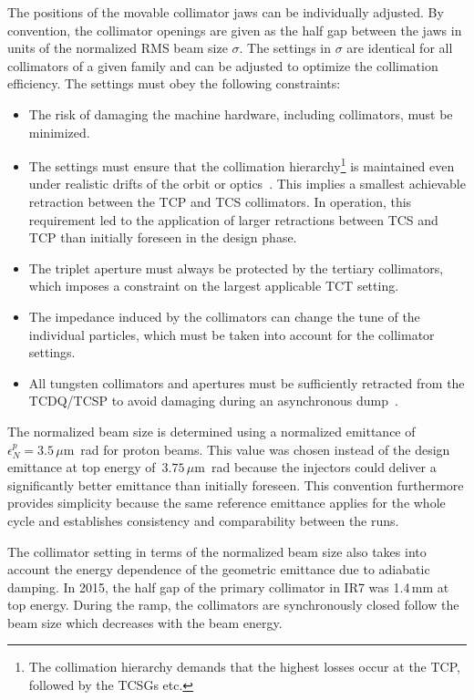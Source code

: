 The positions of the movable collimator jaws can be individually adjusted. By convention, the collimator openings are given as the half gap between the jaws in units of the normalized RMS beam size $\sigma$.  The settings in $\sigma$ are identical for all collimators of a given family and can be adjusted to optimize the collimation efficiency. The settings must obey the following constraints:
% 
\begin{itemize}
  \item The risk of damaging the machine hardware, including collimators, must be minimized.
  \item The settings must ensure that the collimation hierarchy\footnote{The collimation hierarchy demands that the highest losses occur at the TCP, followed by the TCSGs etc.} is maintained even under realistic drifts of the orbit or optics~\cite{CERN-ATS-NOTE-2011-036MD}. This implies a smallest achievable retraction between the TCP and TCS collimators. In operation, this requirement led to the application of larger retractions between TCS and TCP than initially foreseen in the design phase.
  \item The triplet aperture must always be protected by the tertiary collimators, which imposes a constraint on the largest applicable TCT setting. 
  \item The impedance induced by the collimators can change the tune of the individual particles, which must be taken into account for the collimator settings.
  \item All tungsten collimators and apertures must be sufficiently retracted from the TCDQ/TCSP to avoid damaging during an asynchronous dump~\cite{projectnote293}.
\end{itemize}
%
 The normalized beam size is determined using a normalized emittance of \mbox{$\epsilon_N^p = 3.5\,\mu$m rad} for proton beams. This value was chosen instead of the design emittance at top energy \mbox{of $3.75\,\mu$m rad} because the injectors could deliver a significantly better emittance than initially foreseen. This convention furthermore provides simplicity because the same reference emittance applies for the whole cycle and establishes consistency and comparability between the runs. 

The collimator setting in terms of the normalized beam size also takes into account the energy dependence of the geometric emittance due to adiabatic damping. In 2015, the half gap of the primary collimator in IR7 was 1.4\,mm at top energy. During the ramp, the collimators are synchronously closed follow the beam size which decreases with the beam energy. 

